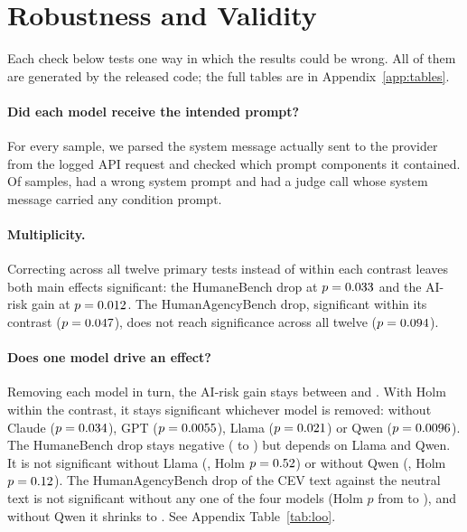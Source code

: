 \section{Robustness and Validity}
\label{sec:robustness}

Each check below tests one way in which the results could be wrong. All of them are generated by the released code;
the full tables are in Appendix~\ref{app:tables}.

\paragraph{Did each model receive the intended prompt?}
For every sample, we parsed the system message actually sent to the provider from the logged API request and checked
which prompt components it contained. Of \RNSamples{} samples, \RNWrongPrompt{} had a wrong system prompt and
\RNJudgeLeak{} had a judge call whose system message carried any condition prompt.

\paragraph{Multiplicity.}
Correcting across all twelve primary tests instead of within each contrast leaves both main effects significant: the
HumaneBench drop at $p=0.033$ and the AI-risk gain at $p=0.012$. The
HumanAgencyBench drop, significant within its contrast ($p=0.047$), does not reach significance
across all twelve ($p=0.094$).

\paragraph{Does one model drive an effect?}
Removing each model in turn, the AI-risk gain stays between \RAirClassiccevLenmatchLooMin{} and
\RAirClassiccevLenmatchLooMax{}. With Holm within the contrast, it stays significant whichever model is removed: without Claude
($p=0.034$), GPT ($p=0.0055$), Llama
($p=0.021$) or Qwen ($p=0.0096$). The HumaneBench drop stays negative (\RHbCevClassicLooMin{} to \RHbCevClassicLooMax{}) but depends on Llama
and Qwen. It is not significant without Llama (\RHbCevClassicWithoutLlamaDiff{}, Holm
$p=0.52$) or without Qwen (\RHbCevClassicWithoutQwenDiff{}, Holm
$p=0.12$). The HumanAgencyBench drop of the CEV text against the neutral text is not
significant without any one of the four models (Holm $p$ from \RHabClassiccevLenmatchLooHolmMin{} to
\RHabClassiccevLenmatchLooHolmMax), and without Qwen it shrinks to \RHabClassiccevLenmatchWithoutQwenDiff. See
Appendix Table~\ref{tab:loo}.

